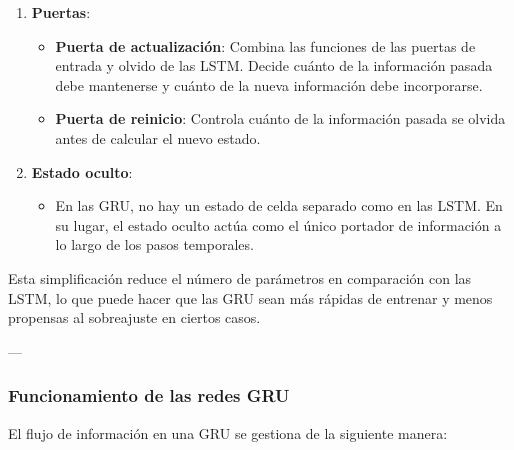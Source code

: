 \documentclass[11pt]{article}
\begin{document}
\begin{enumerate}
\item \textbf{\textbf{Puertas}}:
\begin{itemize}
\item \textbf{\textbf{Puerta de actualización}}: Combina las funciones de las puertas de entrada y olvido de las LSTM. Decide cuánto de la información pasada debe mantenerse y cuánto de la nueva información debe incorporarse.
\item \textbf{\textbf{Puerta de reinicio}}: Controla cuánto de la información pasada se olvida antes de calcular el nuevo estado.
\end{itemize}

\item \textbf{\textbf{Estado oculto}}:
\begin{itemize}
\item En las GRU, no hay un estado de celda separado como en las LSTM. En su lugar, el estado oculto actúa como el único portador de información a lo largo de los pasos temporales.
\end{itemize}
\end{enumerate}

Esta simplificación reduce el número de parámetros en comparación con las LSTM, lo que puede hacer que las GRU sean más rápidas de entrenar y menos propensas al sobreajuste en ciertos casos.

---
\subsubsection{Funcionamiento de las redes GRU}
\label{sec:orge00a051}
El flujo de información en una GRU se gestiona de la siguiente manera:
\end{document}
